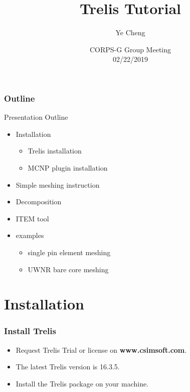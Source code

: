 \documentclass[fleqn]{beamer}
\title[Trelis Tutorial]{
    Trelis Tutorial}
\author[Ye Cheng]{
    Ye Cheng}
\institute[Kansas State University]{
    Mechanical and Nuclear Engineering \\
    Kansas State University}
\date[CORPS-G]{
    CORPS-G Group Meeting \\
    02/22/2019}
\begin{document}
    \newcommand{\beginbackup}{
        \newcounter{framenumbervorappendix}
        \setcounter{framenumbervorappendix}{\value{framenumber}}
    }
    \newcommand{\backupend}{
        \addtocounter{framenumbervorappendix}{-\value{framenumber}}
        \addtocounter{framenumber}{\value{framenumbervorappendix}} 
    }
    
    \begin{frame}
        \titlepage
    \end{frame}
    \begin{frame}
        \frametitle{Outline}
        \begin{block}{Presentation Outline}
            \begin{itemize}
                \item Installation
                \begin{itemize}
                    \item Trelis installation
                    \item MCNP plugin installation
                \end{itemize}
                \item Simple meshing instruction
                \item Decomposition
                \item ITEM tool
                \item examples
		  \begin{itemize}
		   \item single pin element meshing
		   \item UWNR bare core meshing
		  \end{itemize}

            \end{itemize}
        \end{block}
    \end{frame}
\section{Installation}
\begin{frame}
 \frametitle{Install Trelis}
 \begin{itemize}
 \item Request Trelis Trial or license on \textbf{www.csimsoft.com}.
 \item The latest Trelis version is 16.3.5.
 \item Install the Trelis package on your machine.
  \end{itemize}
\end{frame}
\end{document}
